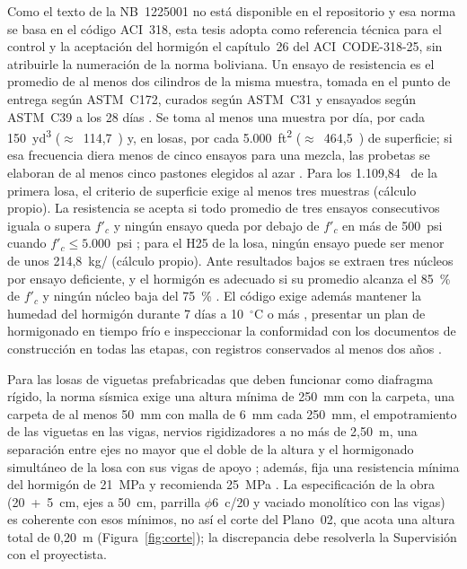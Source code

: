 Como el texto de la NB~1225001 no está disponible en el repositorio y esa norma se basa en el código ACI~318, esta tesis adopta como referencia técnica para el control y la aceptación del hormigón el capítulo~26 del ACI~CODE-318-25, sin atribuirle la numeración de la norma boliviana. Un ensayo de resistencia es el promedio de al menos dos cilindros de la misma muestra, tomada en el punto de entrega según ASTM~C172, curados según ASTM~C31 y ensayados según ASTM~C39 a los 28 días \parencite[sección~26.12.1.1, p.~601]{aci318_2025}. Se toma al menos una muestra por día, por cada 150~yd\textsuperscript{3} ($\approx$~114,7~\mtres{}) y, en losas, por cada 5.000~ft\textsuperscript{2} ($\approx$~464,5~\mdos{}) de superficie; si esa frecuencia diera menos de cinco ensayos para una mezcla, las probetas se elaboran de al menos cinco pastones elegidos al azar \parencite[sección~26.12.2.1, p.~603]{aci318_2025}. Para los 1.109,84~\mdos{} de la primera losa, el criterio de superficie exige al menos tres muestras (cálculo propio). La resistencia se acepta si todo promedio de tres ensayos consecutivos iguala o supera $f'_c$ y ningún ensayo queda por debajo de $f'_c$ en más de 500~psi cuando $f'_c \leq 5.000$~psi \parencite[sección~26.12.3.1, p.~603]{aci318_2025}; para el H25 de la losa, ningún ensayo puede ser menor de unos 214,8~kg/\cmdos{} (cálculo propio). Ante resultados bajos se extraen tres núcleos por ensayo deficiente, y el hormigón es adecuado si su promedio alcanza el 85~\% de $f'_c$ y ningún núcleo baja del 75~\% \parencite[sección~26.12.7, p.~606]{aci318_2025}. El código exige además mantener la humedad del hormigón durante 7 días a 10~$^{\circ}$C o más \parencite[sección~26.5.3.2, p.~581]{aci318_2025}, presentar un plan de hormigonado en tiempo frío \parencite[sección~26.5.4.2, p.~583]{aci318_2025} e inspeccionar la conformidad con los documentos de construcción en todas las etapas, con registros conservados al menos dos años \parencite[secciones~26.13.1.2 y 26.13.2.1, pp.~608, 610]{aci318_2025}.

Para las losas de viguetas prefabricadas que deben funcionar como diafragma rígido, la norma sísmica exige una altura mínima de 250~mm con la carpeta, una carpeta de al menos 50~mm con malla de 6~mm cada 250~mm, el empotramiento de las viguetas en las vigas, nervios rigidizadores a no más de 2,50~m, una separación entre ejes no mayor que el doble de la altura y el hormigonado simultáneo de la losa con sus vigas de apoyo \parencite[art.~12, p.~22]{mopsv2023nbds}; además, fija una resistencia mínima del hormigón de 21~MPa y recomienda 25~MPa \parencite[art.~16, p.~28]{mopsv2023nbds}. La especificación de la obra (20~+~5~cm, ejes a 50~cm, parrilla $\phi$6~c/20 y vaciado monolítico con las vigas) es coherente con esos mínimos, no así el corte del Plano~02, que acota una altura total de 0,20~m (Figura~\ref{fig:corte}); la discrepancia debe resolverla la Supervisión con el proyectista.

